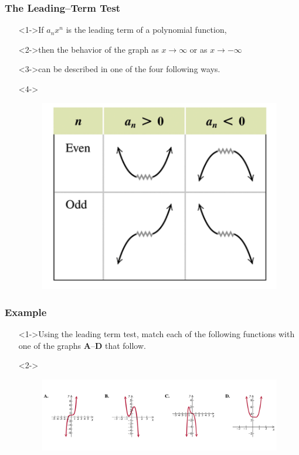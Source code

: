\documentclass{beamer}
\begin{document}
\begin{frame}
  \frametitle{The Leading--Term Test}
  \begin{enumerate}
    \item[]<1->If $a_{n}x^{n}$ is the leading term of a polynomial function,
    \item[]<2->then the behavior of the graph as $x \rightarrow \infty$ or as $x \rightarrow -\infty$
    \item[]<3->can be described in one of the four following ways.
    \item[]<4->
    \begin{figure}
			\begin{center}
				\caption{}
				\includegraphics[scale=0.35]{4_1_3.png}
			\end{center}
		\end{figure}
  \end{enumerate}
\end{frame}

\begin{frame}
  \frametitle{Example}
  \begin{enumerate}
    \item[]<1->Using the leading term test, match each of the following functions with
    one of the graphs \textbf{A}--\textbf{D} that follow.
    \item[]<2->
    \begin{figure}
      \begin{center}
        \caption{}
        \includegraphics[scale=0.35]{4_1_4.png}
      \end{center}
    \end{figure}
  \end{enumerate}
\end{frame}
\end{document}
